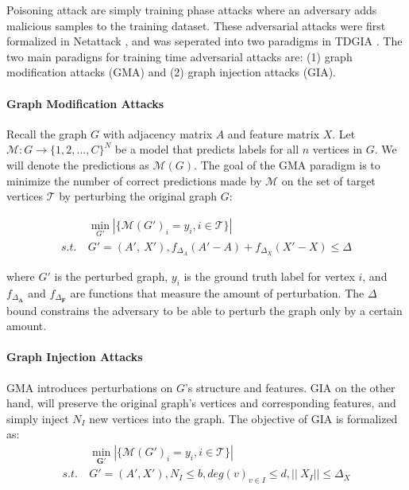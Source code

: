 \documentclass{article}
\begin{document}
Poisoning attack are simply training phase attacks where an adversary adds malicious samples to the training dataset. These adversarial attacks were first formalized in Netattack \cite{netattack}, and was seperated into two paradigms in TDGIA \cite{TDGIA}. The two main paradigns for training time adversarial attacks are: (1) graph modification attacks (GMA) and (2) graph injection attacks (GIA). 

\paragraph{Graph Modification Attacks}

Recall the graph $G$ with adjacency matrix $A$ and feature matrix $X$. Let $\mathcal{M}:G\rightarrow \{1,2,...,C\}^N$ be a model that predicts labels for all $n$ vertices in $G$. We will denote the predictions as $\mathcal{M}(G)$. The goal of the GMA paradigm is to minimize the number of correct predictions made by $\mathcal{M}$ on the set of target vertices $\mathcal{T}$ by perturbing the original graph $G$:

\begin{equation}
\label{GMA}
\begin{split}
& \min_{G'}|\{\mathcal{M}(G')_i=y_i, i\in\mathcal{T}\}| \\
s.t.\ & G'=(A', \ X'),f_{\Delta_{A}}(A'-A)+f_{\Delta_{X}}(X'-X)\leq\Delta
\end{split}    
\end{equation}

where $G'$ is the perturbed graph, $y_i$ is the ground truth label for vertex $i$, and $f_{\Delta_{\mathbf{A}}}$ and $f_{\Delta_{\mathbf{F}}}$ are functions that measure the amount of perturbation. The $\Delta$ bound constrains the adversary to be able to perturb the graph only by a certain amount. 

\paragraph{Graph Injection Attacks}
GMA introduces perturbations on $G$'s structure and features. GIA on the other hand, will preserve the original graph's vertices and corresponding features, and simply inject $N_I$ new vertices into the graph. The objective of GIA is formalized as:
\begin{equation}
\label{GIA}
\begin{split}
& \min_{\mathbf{G}'} |\{\mathcal{M}(G')_i=y_i, i\in\mathcal{T}\}| \\
s.t.\ & G'=(A',X'), N_I \leq b, deg(v)_{v\in I}\leq d, ||\ X_I||\leq \Delta_X
\end{split}
\end{equation}
\end{document}
